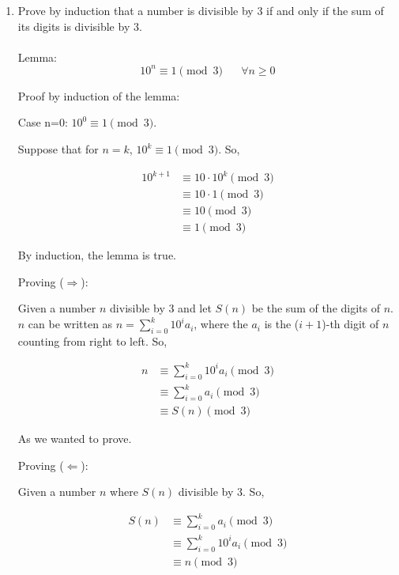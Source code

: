 \documentclass{article}
\begin{document}
\begin{enumerate}
  \item Prove by induction that a number is divisible by 3 if and only if the sum of its digits is divisible by 3.
  \\
  \\
  Lemma: 
  $$10^n\equiv 1 \pmod{3} \hspace{20pt} \forall n\geq0$$
  
  Proof by induction of the lemma:
  
  Case n=0: $10^0\equiv 1 \pmod{3}$.
  
  Suppose that for $n=k$, $10^k\equiv 1 \pmod{3}$. So, 
  
  \begin{equation*}
    \begin{split}
        10^{k+1} &\equiv 10\cdot10^k \pmod{3} \\
        &\equiv 10\cdot 1 \pmod{3} \\
        &\equiv 10 \pmod{3} \\
        &\equiv 1 \pmod{3}
    \end{split}
  \end{equation*}
    
  By induction, the lemma is true.
    
  Proving ($\Rightarrow$): 
  
  Given a number $n$ divisible by 3 and let $S(n)$ be the sum of the digits of $n$. $n$ can be written as $n = \sum_{i=0}^k 10^i a_i$, where the $a_i$ is the ($i+1$)-th digit of $n$ counting from right to left.
  So, 
  
  \begin{equation*}
    \begin{split}
        n &\equiv \sum_{i=0}^k 10^i a_i \pmod{3} \\
        &\equiv \sum_{i=0}^k a_i \pmod{3} \\
        &\equiv S(n) \pmod{3}
    \end{split}
  \end{equation*}
  
  As we wanted to prove.
  
  
  Proving ($\Leftarrow$): 
  
  Given a number $n$ where $S(n)$ divisible by 3. So,
  
  \begin{equation*}
    \begin{split}
        S(n) &\equiv \sum_{i=0}^k a_i \pmod{3} \\
        &\equiv \sum_{i=0}^k 10^i a_i \pmod{3} \\
        &\equiv n \pmod{3}
    \end{split}
  \end{equation*}
  

\end{enumerate}
\end{document}
